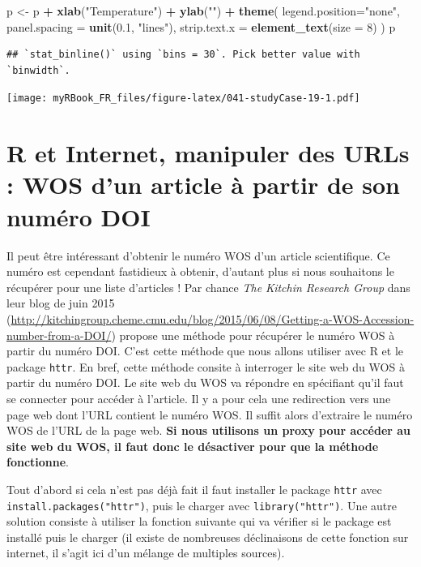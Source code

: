 \documentclass[
]{book}
\newenvironment{Shaded}{\begin{snugshade}}{\end{snugshade}}
\newcommand{\DataTypeTok}[1]{\textcolor[rgb]{0.13,0.29,0.53}{#1}}
\newcommand{\DecValTok}[1]{\textcolor[rgb]{0.00,0.00,0.81}{#1}}
\newcommand{\FloatTok}[1]{\textcolor[rgb]{0.00,0.00,0.81}{#1}}
\newcommand{\KeywordTok}[1]{\textcolor[rgb]{0.13,0.29,0.53}{\textbf{#1}}}
\newcommand{\NormalTok}[1]{#1}
\newcommand{\OperatorTok}[1]{\textcolor[rgb]{0.81,0.36,0.00}{\textbf{#1}}}
\newcommand{\StringTok}[1]{\textcolor[rgb]{0.31,0.60,0.02}{#1}}
\begin{document}
\begin{Shaded}
\begin{Highlighting}[]
\NormalTok{p <-}\StringTok{ }\NormalTok{p }\OperatorTok{+}\StringTok{ }\KeywordTok{xlab}\NormalTok{(}\StringTok{"Temperature"}\NormalTok{) }\OperatorTok{+}\StringTok{ }\KeywordTok{ylab}\NormalTok{(}\StringTok{""}\NormalTok{) }\OperatorTok{+}
\StringTok{    }\KeywordTok{theme}\NormalTok{(}
      \DataTypeTok{legend.position=}\StringTok{"none"}\NormalTok{,}
      \DataTypeTok{panel.spacing =} \KeywordTok{unit}\NormalTok{(}\FloatTok{0.1}\NormalTok{, }\StringTok{"lines"}\NormalTok{),}
      \DataTypeTok{strip.text.x =} \KeywordTok{element_text}\NormalTok{(}\DataTypeTok{size =} \DecValTok{8}\NormalTok{)}
\NormalTok{    ) }
\NormalTok{p}
\end{Highlighting}
\end{Shaded}

\begin{verbatim}
## `stat_binline()` using `bins = 30`. Pick better value with `binwidth`.
\end{verbatim}

\texttt{[image: myRBook\_FR\_files/figure-latex/041-studyCase-19-1.pdf]}

\hypertarget{studyCase002}{%
\chapter{R et Internet, manipuler des URLs : WOS d'un article à partir de son numéro DOI}\label{studyCase002}}

Il peut être intéressant d'obtenir le numéro WOS d'un article scientifique. Ce numéro est cependant fastidieux à obtenir, d'autant plus si nous souhaitons le récupérer pour une liste d'articles ! Par chance \emph{The Kitchin Research Group} dans leur blog de juin 2015 (\url{http://kitchingroup.cheme.cmu.edu/blog/2015/06/08/Getting-a-WOS-Accession-number-from-a-DOI/}) propose une méthode pour récupérer le numéro WOS à partir du numéro DOI. C'est cette méthode que nous allons utiliser avec R et le package \texttt{httr}. En bref, cette méthode consite à interroger le site web du WOS à partir du numéro DOI. Le site web du WOS va répondre en spécifiant qu'il faut se connecter pour accéder à l'article. Il y a pour cela une redirection vers une page web dont l'URL contient le numéro WOS. Il suffit alors d'extraire le numéro WOS de l'URL de la page web. \textbf{Si nous utilisons un proxy pour accéder au site web du WOS, il faut donc le désactiver pour que la méthode fonctionne}.

Tout d'abord si cela n'est pas déjà fait il faut installer le package \texttt{httr} avec \texttt{install.packages("httr")}, puis le charger avec \texttt{library("httr")}. Une autre solution consiste à utiliser la fonction suivante qui va vérifier si le package est installé puis le charger (il existe de nombreuses déclinaisons de cette fonction sur internet, il s'agit ici d'un mélange de multiples sources).
\end{document}
